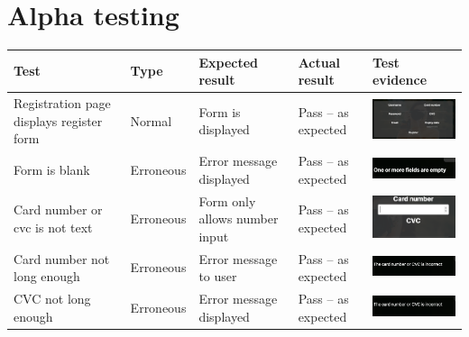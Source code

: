 \section{Alpha testing}
\begin{center}
\begin{longtable}{|P{23mm}|P{20mm}|P{19mm}|P{20mm}|P{54mm}|}
  \hline
  \textbf{Test} & \textbf{Type} & \textbf{Expected result} & \textbf{Actual result} & \textbf{Test evidence} \\
  \hline
  \endfirsthead
  \hline
  \endhead
  \hline 

  \endfoot
  \endlastfoot

Registration page displays register form & Normal & Form is displayed &
Pass -- as expected &
\includegraphics[width=51mm]{ch4_testing_for_eval/media/image2.png} \\ \hline
Form is blank & Erroneous & Error message displayed & Pass -- as
expected &
\includegraphics[width=51mm]{ch4_testing_for_eval/media/image3.png} \\ \hline
Card number or cvc is not text & Erroneous & Form only allows number
input & Pass -- as expected &
\includegraphics[width=51mm]{ch4_testing_for_eval/media/image4.png} \\ \hline
Card number not long enough & Erroneous & Error message to user & Pass
-- as expected &
\includegraphics[width=51mm]{ch4_testing_for_eval/media/image5.png} \\ \hline
CVC not long enough & Erroneous & Error message displayed & Pass -- as
expected &
\includegraphics[width=51mm]{ch4_testing_for_eval/media/image5.png} \\ \hline

\end{longtable}
\end{center}
